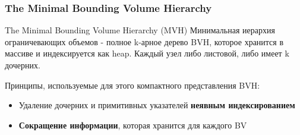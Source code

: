 \documentclass{beamer}
\begin{document}
\begin{frame}[t]
    \frametitle{The Minimal Bounding Volume Hierarchy}
    \begin{block}{The Minimal Bounding Volume Hierarchy (MVH)}
        Минимальная иерархия ограничевающих объемов - полное k-арное дерево BVH, которое хранится в массиве
        и индексируется как heap.
        Каждый узел либо листовой, либо имеет k дочерних.
    \end{block}
    Принципы, используемые для этого компактного представления BVH:
    \begin{itemize}
        \item
            Удаление дочерних и примитивных указателей \textbf{неявным индексированием}
        \item
            \textbf{Сокращение информации}, которая хранится для каждого BV
    \end{itemize}

\end{frame}
\end{document}
